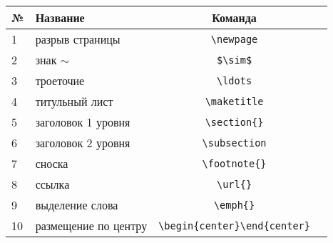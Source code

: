 \documentclass[a4paper,12pt]{article} %
\begin{document}
\begin{tabular}{l||l||cc}
 \hline
 № & Название & Команда\\
 \hline\hline
 1 & разрыв страницы & \verb|\newpage|\\
 2 & знак $\sim$ & \verb|$\sim$|\\
 3 & троеточие & \verb|\ldots|\\
 4 & титульный лист & \verb|\maketitle|\\
 5 & заголовок 1 уровня & \verb|\section{}|\\
 6 & заголовок 2 уровня & \verb|\subsection|\\
 7 & сноска & \verb|\footnote{}|\\
 8 & ссылка & \verb|\url{}|\\
 9 & выделение слова & \verb|\emph{}|\\
 10 & размещение по центру & \verb|\begin{center}\end{center}|
 \end{tabular}
\end{document}
